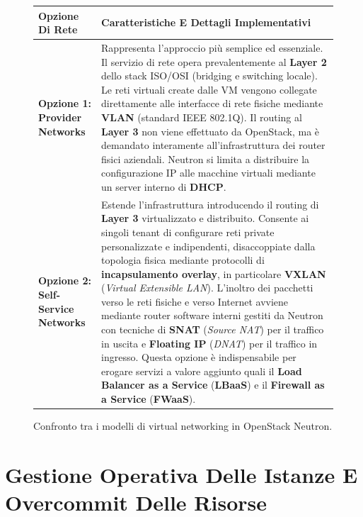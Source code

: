 \documentclass[11pt, a4paper]{article}
\begin{document}
\begin{figure}[H]
\centering
\begin{tabularx}{\textwidth}{p{4.2cm}X}
\toprule
\textbf{Opzione Di Rete} & \textbf{Caratteristiche E Dettagli Implementativi} \\
\midrule
\textbf{Opzione 1: Provider Networks} &
Rappresenta l'approccio più semplice ed essenziale. Il servizio di rete opera prevalentemente al \textbf{Layer 2} dello stack ISO/OSI (bridging e switching locale). Le reti virtuali create dalle VM vengono collegate direttamente alle interfacce di rete fisiche mediante \textbf{VLAN} (standard IEEE 802.1Q).
\vspace{0.15cm}
Il routing al \textbf{Layer 3} non viene effettuato da OpenStack, ma è demandato interamente all'infrastruttura dei router fisici aziendali. Neutron si limita a distribuire la configurazione IP alle macchine virtuali mediante un server interno di \textbf{DHCP}. \\
\addlinespace
\textbf{Opzione 2: Self-Service Networks} &
Estende l'infrastruttura introducendo il routing di \textbf{Layer 3} virtualizzato e distribuito. Consente ai singoli tenant di configurare reti private personalizzate e indipendenti, disaccoppiate dalla topologia fisica mediante protocolli di \textbf{incapsulamento overlay}, in particolare \textbf{VXLAN} (\emph{Virtual Extensible LAN}).
\vspace{0.15cm}
L'inoltro dei pacchetti verso le reti fisiche e verso Internet avviene mediante router software interni gestiti da Neutron con tecniche di \textbf{SNAT} (\emph{Source NAT}) per il traffico in uscita e \textbf{Floating IP} (\emph{DNAT}) per il traffico in ingresso. Questa opzione è indispensabile per erogare servizi a valore aggiunto quali il \textbf{Load Balancer as a Service} (\textbf{LBaaS}) e il \textbf{Firewall as a Service} (\textbf{FWaaS}). \\
\bottomrule
\end{tabularx}
\caption{Confronto tra i modelli di virtual networking in OpenStack Neutron.}
\end{figure}

\newpage


\section{Gestione Operativa Delle Istanze E Overcommit Delle Risorse}
\end{document}
